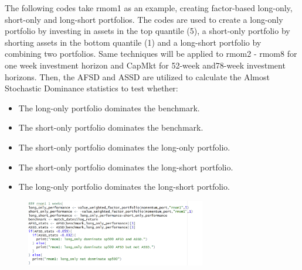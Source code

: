 \documentclass{article}
\begin{document}
The following codes take rmom1 as an example, creating factor-based long-only, short-only and long-short portfolios. The codes are used to create a long-only portfolio by investing in assets in the top quantile (5), a short-only portfolio by shorting assets in the bottom quantile (1) and a long-short portfolio by combining two portfolios. Same techniques will be applied to rmom2 - rmom8 for one week investment horizon and CapMkt for 52-week and78-week investment horizons. Then, the AFSD and ASSD are utilized to calculate the Almost Stochastic Dominance statistics to test whether:
\begin{itemize}
    \item The long-only portfolio dominates the benchmark.
    \item The short-only portfolio dominates the benchmark.
    \item The short-only portfolio dominates the long-only portfolio.
    \item The short-only portfolio dominates the long-short portfolio.
    \item The long-only portfolio dominates the long-short portfolio.
\end{itemize}
\begin{figure}[H]
    \centering
    \includegraphics[width=0.7\textwidth]{17.png}
    \label{fig:example}
\end{figure}
\end{document}
